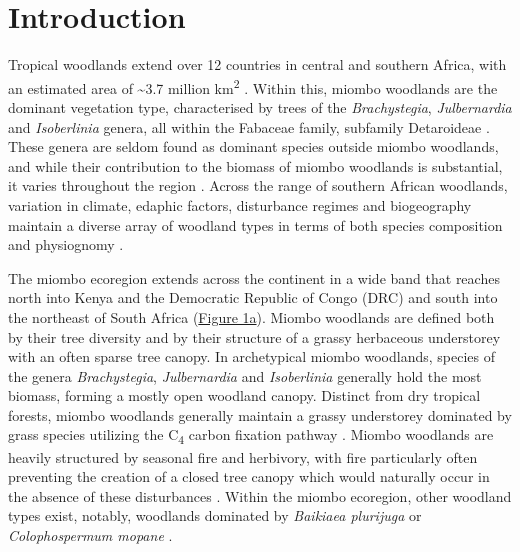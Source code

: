 \documentclass[diversity,article,submit,moreauthors,pdftex]{Definitions/mdpi}
\begin{document}

\section{Introduction}

Tropical woodlands extend over 12 countries in central and southern Africa, with an estimated area of \textasciitilde{}3.7 million km\textsuperscript{2} \citep{White1983, Mayaux2004, Arino2010}. Within this, miombo woodlands are the dominant vegetation type, characterised by trees of the \textit{Brachystegia}, \textit{Julbernardia} and \textit{Isoberlinia} genera, all within the Fabaceae family, subfamily Detaroideae \citep{Chidumayo1997, Campbell2002, Azani2017}. These genera are seldom found as dominant species outside miombo woodlands, and while their contribution to the biomass of miombo woodlands is substantial, it varies throughout the region \citep{Campbell2002}. Across the range of southern African woodlands, variation in climate, edaphic factors, disturbance regimes and biogeography maintain a diverse array of woodland types in terms of both species composition and physiognomy \citep{Privette2004, Caylor2004, Chidumayo2002}. 

The miombo ecoregion extends across the continent in a wide band that reaches north into Kenya and the Democratic Republic of Congo (DRC) and south into the northeast of South Africa (\hyperref[plot_map]{Figure 1a}). Miombo woodlands are defined both by their tree diversity and by their structure of a grassy herbaceous understorey with an often sparse tree canopy. In archetypical miombo woodlands, species of the genera \textit{Brachystegia}, \textit{Julbernardia} and \textit{Isoberlinia} generally hold the most biomass, forming a mostly open woodland canopy. Distinct from dry tropical forests, miombo woodlands generally maintain a grassy understorey dominated by grass species utilizing the C\textsubscript{4} carbon fixation pathway \citep{Dexter2015}. Miombo woodlands are heavily structured by seasonal fire and herbivory, with fire particularly often preventing the creation of a closed tree canopy which would naturally occur in the absence of these disturbances \citep{Oliveras2016, Dantas2016}. Within the miombo ecoregion, other woodland types exist, notably, woodlands dominated by \textit{Baikiaea plurijuga} or \textit{Colophospermum mopane} \citep{Campbell2002}.
\end{document}
